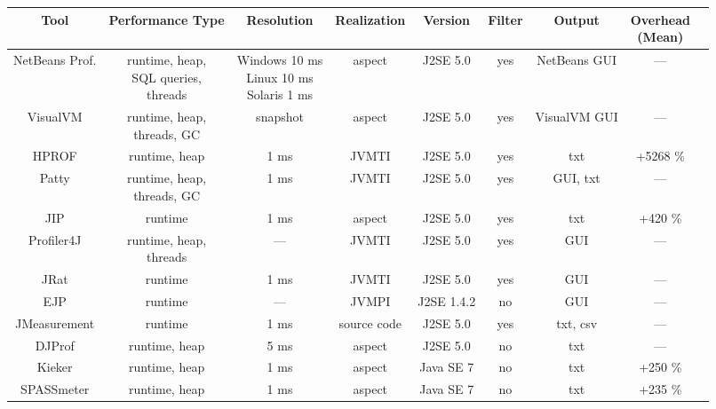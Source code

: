 \begin{table}

    \begin{tabular}{*{9}{c}}
    	\toprule
        Tool & Performance Type & Resolution & Realization & Version & Filter & Output & \makecell{Overhead \\ (Mean)} \\
        \midrule
        NetBeans Prof. & \makecell{runtime, heap, \\ SQL queries, \\ threads} & \makecell{Windows 10 ms \\ Linux 10 ms \\ Solaris 1 ms} & aspect & J2SE 5.0 & yes & NetBeans GUI & --- \\
        \midrule
        VisualVM & \makecell{runtime, heap, \\ threads, GC} & snapshot & aspect & J2SE 5.0 & yes & VisualVM GUI & --- \\
        \midrule
        HPROF & runtime, heap & 1 ms & JVMTI & J2SE 5.0 & yes & txt & +5268 \% \\
        \midrule
        Patty & \makecell{runtime, heap, \\ threads, GC} & 1 ms & JVMTI & J2SE 5.0 & yes & GUI, txt & --- \\
        \midrule
        JIP & runtime & 1 ms & aspect & J2SE 5.0 & yes & txt & +420 \% \\
        \midrule
        Profiler4J & \makecell{runtime, heap, \\ threads} & --- & JVMTI & J2SE 5.0 & yes & GUI & --- \\
        \midrule
        JRat & runtime & 1 ms & JVMTI & J2SE 5.0 & yes & GUI & --- \\
        \midrule
        EJP & runtime & --- & JVMPI & J2SE 1.4.2 & no & GUI & --- \\
        \midrule
        JMeasurement & runtime & 1 ms & source code & J2SE 5.0 & yes & txt, csv & --- \\
        \midrule
        DJProf & runtime, heap & 5 ms & aspect & J2SE 5.0 & no & txt & --- \\
        \midrule
        Kieker & runtime, heap & 1 ms & aspect & Java SE 7 & no & txt & +250 \% \\
        \midrule
        SPASSmeter & runtime, heap & 1 ms & aspect & Java SE 7 & no & txt & +235 \% \\


        \bottomrule
    \end{tabular}
    \label{java_monitoring_tools}
\end{table}

